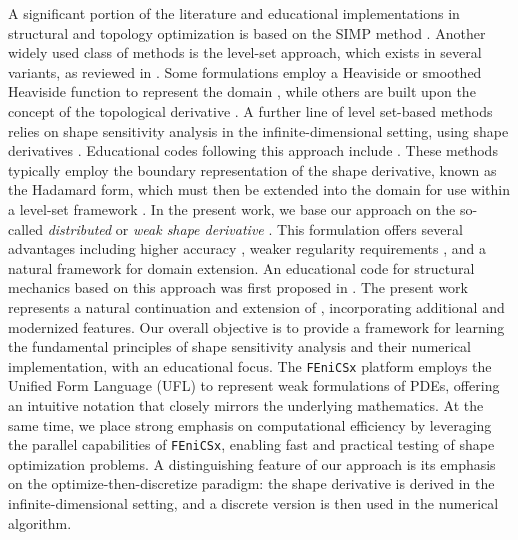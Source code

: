 \documentclass[iicol,pdflatex,sn-mathphys-ay]{sn-jnl}%
\theoremstyle{thmstyleone}%
\theoremstyle{thmstyletwo}%
\theoremstyle{thmstylethree}%
\begin{document}
A significant portion of the literature and educational implementations
in structural and topology optimization is based on
the SIMP method \citep{Sigmund2014}.
Another widely used class of methods is the level-set approach,
which exists in several variants, as reviewed in \cite{MR3107583}.
Some formulations employ a Heaviside or smoothed Heaviside
function to represent the domain \citep{MR1951408}, while others
are built upon the concept of the topological derivative
\citep{MR2235384,MR3013681,MR4916810}.
A further line of level set-based methods relies on shape sensitivity analysis
in the infinite-dimensional setting,
using shape derivatives \citep{MR2731611,MR1215733}.
Educational codes following this approach include \cite{Challis2009,MR2459656}.
These methods typically employ the boundary representation of the shape derivative,
known as the Hadamard form, which must then be extended into the domain for use
within a level-set framework \citep{MR2225309}.
In the present work, we base our approach on the so-called {\it distributed}
or {\it weak shape derivative} \citep{LAURAIN2020328,MR3535238}.
This formulation offers several advantages including
higher accuracy \citep{MR2642680,MR3348199}, 
weaker regularity requirements \citep{LAURAIN2020328},
and a natural framework for domain extension.
An educational code for structural mechanics based on
this approach was first proposed in \cite{MR3843884}.
The present work represents a natural continuation and extension of \cite{MR3843884},
incorporating additional and modernized features.
Our overall objective is to provide a framework for learning the fundamental
principles of shape sensitivity analysis and their
numerical implementation, with an educational focus. 
The \texttt{FEniCSx} platform \citep{fenicsx} employs
the Unified Form Language (UFL) to represent weak formulations of PDEs,
offering an intuitive notation that closely mirrors the underlying mathematics.
At the same time, we place strong emphasis on computational efficiency
by leveraging the parallel capabilities of \texttt{FEniCSx},
enabling fast and practical testing of shape optimization problems.
A distinguishing feature of our approach is its emphasis on
the optimize-then-discretize paradigm: the shape derivative
is derived in the infinite-dimensional setting, and a discrete
version is then used in the numerical algorithm.
\end{document}
